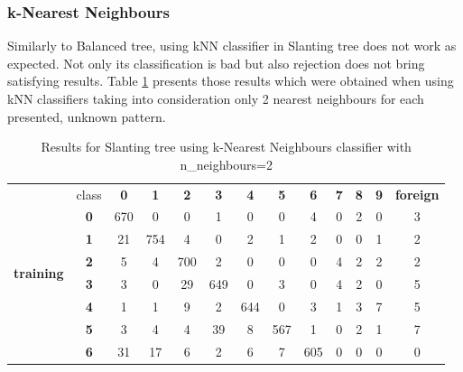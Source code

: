 \subsubsection{k-Nearest Neighbours}

Similarly to Balanced tree, using kNN classifier in Slanting tree does not work as expected. Not only its classification is bad but also rejection does not bring satisfying results. Table \ref{slanting_tree_knn_results} presents those results which were obtained when using kNN classifiers taking into consideration only 2 nearest neighbours for each presented, unknown pattern.

\begin{table}[htp]
	\centering
	\caption{Results for Slanting tree using k-Nearest Neighbours classifier with n\_neighbours=2}
	\label{slanting_tree_knn_results}
	\begin{tabular}{|c|c|c|c|c|c|c|c|c|c|c|c|c|}
		\hline
		\multirow{11}{*}{\textbf{training}} & class      & \textbf{0} & \textbf{1} & \textbf{2} & \textbf{3} & \textbf{4} & \textbf{5} & \textbf{6} & \textbf{7} & \textbf{8} & \textbf{9} & \textbf{foreign} \\ \cline{2-13} 
		& \textbf{0} & 670        & 0          & 0          & 1          & 0          & 0          & 4          & 0          & 2          & 0          & 3                \\ \cline{2-13} 
		& \textbf{1} & 21         & 754        & 4          & 0          & 2          & 1          & 2          & 0          & 0          & 1          & 2                \\ \cline{2-13} 
		& \textbf{2} & 5          & 4          & 700        & 2          & 0          & 0          & 0          & 4          & 2          & 2          & 2                \\ \cline{2-13} 
		& \textbf{3} & 3          & 0          & 29         & 649        & 0          & 3          & 0          & 4          & 2          & 0          & 5                \\ \cline{2-13} 
		& \textbf{4} & 1          & 1          & 9          & 2          & 644        & 0          & 3          & 1          & 3          & 7          & 5                \\ \cline{2-13} 
		& \textbf{5} & 3          & 4          & 4          & 39         & 8          & 567        & 1          & 0          & 2          & 1          & 7                \\ \cline{2-13} 
		& \textbf{6} & 31         & 17         & 6          & 2          & 6          & 7          & 605        & 0          & 0          & 0          & 0                \\ \cline{2-13} 

\end{tabular}
\end{table}
